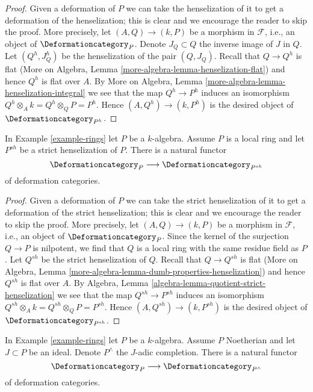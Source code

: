 \begin{proof}
Given a deformation of $P$ we can take the henselization
of it to get a deformation of the henselization; this is
clear and we encourage the reader to skip the proof. More precisely,
let $(A, Q) \to (k, P)$ be a morphism in $\mathcal{F}$, i.e.,
an object of $\Deformationcategory_P$. Denote $J_Q \subset Q$ the inverse
image of $J$ in $Q$. Let $(Q^h, J_Q^h)$ be the henselization of
the pair $(Q, J_Q)$. Recall that $Q \to Q^h$ is flat
(More on Algebra, Lemma \ref{more-algebra-lemma-henselization-flat})
and hence $Q^h$ is flat over $A$.
By More on Algebra, Lemma \ref{more-algebra-lemma-henselization-integral}
we see that the map $Q^h \to P^h$ induces an isomorphism
$Q^h \otimes_A k = Q^h \otimes_Q P = P^h$.
Hence $(A, Q^h) \to (k, P^h)$ is the desired object of
$\Deformationcategory_{P^h}$.
\end{proof}

\begin{lemma}
\label{lemma-strict-henselization}
In Example \ref{example-rings} let $P$ be a $k$-algebra.
Assume $P$ is a local ring and let $P^{sh}$ be a strict henselization of $P$.
There is a natural functor
$$
\Deformationcategory_P \longrightarrow \Deformationcategory_{P^{sh}}
$$
of deformation categories.
\end{lemma}

\begin{proof}
Given a deformation of $P$ we can take the strict henselization
of it to get a deformation of the strict henselization; this is
clear and we encourage the reader to skip the proof. More precisely,
let $(A, Q) \to (k, P)$ be a morphism in $\mathcal{F}$, i.e.,
an object of $\Deformationcategory_P$. Since the kernel of the surjection
$Q \to P$ is nilpotent, we find that $Q$ is a local ring with the
same residue field as $P$. Let $Q^{sh}$ be the strict henselization
of $Q$. Recall that $Q \to Q^{sh}$ is flat
(More on Algebra, Lemma \ref{more-algebra-lemma-dumb-properties-henselization})
and hence $Q^{sh}$ is flat over $A$.
By Algebra, Lemma \ref{algebra-lemma-quotient-strict-henselization}
we see that the map $Q^{sh} \to P^{sh}$ induces an isomorphism
$Q^{sh} \otimes_A k = Q^{sh} \otimes_Q P = P^{sh}$.
Hence $(A, Q^{sh}) \to (k, P^{sh})$ is the desired object of
$\Deformationcategory_{P^{sh}}$.
\end{proof}

\begin{lemma}
\label{lemma-completion}
In Example \ref{example-rings} let $P$ be a $k$-algebra.
Assume $P$ Noetherian and let $J \subset P$ be an ideal.
Denote $P^\wedge$ the $J$-adic completion.
There is a natural functor
$$
\Deformationcategory_P \longrightarrow \Deformationcategory_{P^\wedge}
$$
of deformation categories.
\end{lemma}

